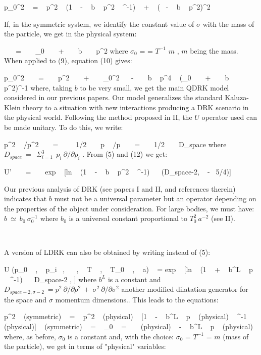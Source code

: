 \documentclass[a4paper,12pt,dvips]{article}
\begin{document}
\equation
p_{0}^2 ~ = ~ p^2 ~ (1 ~ - ~ b ~ p^2 ~ \sigma ^{-1}) ~ + ~ (\sigma ~ - ~ b ~ p^2)^2 
\endequation
\noindent

If, in the symmetric system, we identify the constant value of $\sigma $ with the mass of the particle, we get in the physical system:

\equation
\sigma ~ ~ = ~ ~ \sigma _0 ~ ~ + ~ ~ b ~ ~ p^2
\endequation
\noindent
where $\sigma _0$ = = $T^{-1}$ $m$ , $m$ being the mass. When applied to (9), equation (10) gives:

\equation
p_{0}^2 ~ ~ = ~ ~ p^2 ~ ~ + ~ ~ \sigma _0^2~ ~ - ~ ~ b ~ p^4 ~ (\sigma _0 ~ ~ + ~ ~ b ~ ~ p^2)^{-1}
\endequation
\noindent
where, taking $b$ to be very small, we get the main QDRK model considered in our previous papers. Our model generalizes the standard Kaluza-Klein theory to a situation with new interactions producing a DRK scenario in the physical world. Following the method proposed in II, the $U$ operator used can be made unitary. To do this, we write:

\equation
p^2 ~ \partial /\partial p^2 ~ ~ =~ ~ ~ 1/2 ~ ~ p ~ \partial /\partial p ~ ~ = ~ ~ 1/2 ~ ~ D_{space}
\endequation
\noindent
where $D_{space} ~ = ~ ~ \Sigma _{i=1} ^3 ~ ~ p_i ~ \partial /\partial p_i$ . From (5) and (12) we get:

\equation
U' ~ ~ = ~ ~ exp ~ [ln ~ (1 ~ - ~ b ~ p^2 ~ \sigma ^{-1}) ~ ~(D_{space-2,\sigma } ~ - ~5/4)]
\endequation
\noindent

Our previous analysis of DRK (see papers I and II, and references therein) indicates that $b$ must not be a universal parameter but an operator depending on the properties of the object under consideration. For large bodies, we must have: $b ~ \simeq ~ b_0 ~ \sigma _0^{-1}$ where $b_0$ is a universal constant proportional to $T_0^2 ~ a^{-2}$ (see II).

~ 

A version of LDRK can also be obtained by writing instead of (5):

\equation
U (p_0 ~ , ~ p_i ~,~ \sigma  ~ , ~ T ~ , ~ T_0 ~ , ~ a) ~ = exp ~ [ln ~ (1 ~ + ~ b^L ~ p ~ \sigma ^{-1}) ~ ~D_{space-2 , }]
\endequation
\noindent
where $b^L$ is a constant and $D_{space-2 , \sigma-2} ~ = p^2 ~ \partial /\partial p^2 ~ + ~ \sigma ^2 ~ \partial /\partial \sigma ^2 $ another modified dilatation generator for the space and $\sigma$ momentum dimensions.. This leads to the equations:

\equation
p^2 ~ (symmetric) ~ = ~ p^2 ~ (physical) ~ [1 ~ - ~ b^L ~ p ~ (physical) ~ \sigma ^{-1} ~ (physical)]
\endequation
\equation
\sigma ~ (symmetric) ~ = ~ \sigma _0 ~ = ~ \sigma ~ (physical) ~ - ~ b^L ~ p ~ (physical)
\endequation
\noindent
where, as before, $\sigma _0 $ is a constant and, with the choice: $\sigma _0 $ = $T^{-1}$ = $m$ (mass of the particle), we get in terms of "physical" variables:
\end{document}
